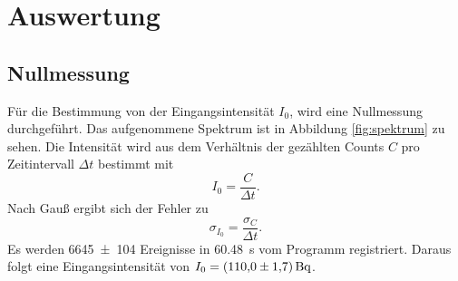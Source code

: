 \section{Auswertung}
\label{sec:Auswertung}
\subsection{Nullmessung}
Für die Bestimmung von der Eingangsintensität $I_0$, wird eine Nullmessung durchgeführt.
Das aufgenommene Spektrum ist in Abbildung \ref{fig:spektrum} zu sehen.
Die Intensität wird aus dem Verhältnis der gezählten Counts $C$ pro Zeitintervall $\Delta t$ bestimmt mit
\begin{equation}
    I_0=\frac{C}{\Delta t}.
\end{equation}
Nach Gauß ergibt sich der Fehler zu
\begin{equation}
    \sigma_{I_0}=\frac{\sigma_C}{\Delta t}.
\end{equation}
Es werden \num{6645(104)} Ereignisse in \SI{60.48}{\second} vom Programm registriert.
Daraus folgt eine Eingangsintensität von $I_0=\SI{110.0\pm1.7}{\becquerel}$.

